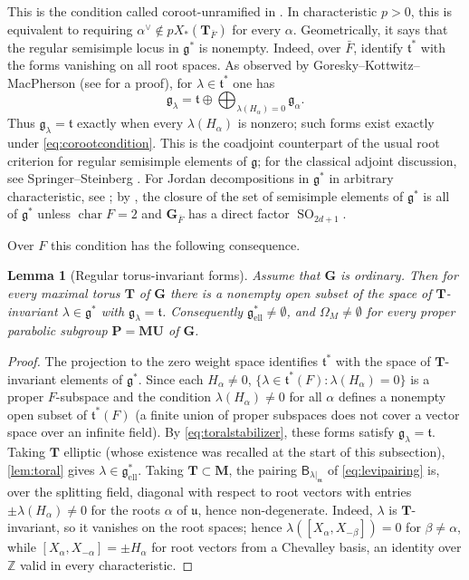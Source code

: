 \documentclass[11pt,reqno]{amsart}
\numberwithin{equation}{section}
\theoremstyle{plain}
\newtheorem{lemma}[theorem]{Lemma}
\theoremstyle{definition}
\theoremstyle{remark}
\theoremstyle{plain}
\newcommand{\Z}{\mathbb{Z}}      %
\newcommand{\bG}{\mathbf{G}}     %
\newcommand{\bP}{\mathbf{P}}     %
\newcommand{\bM}{\mathbf{M}}     %
\newcommand{\bU}{\mathbf{U}}     %
\newcommand{\bT}{\mathbf{T}}     %
\newcommand{\g}{\mathfrak{g}}    %
\newcommand{\gd}{\mathfrak{g}^*} %
\newcommand{\uu}{\mathfrak{u}}   %
\newcommand{\m}{\mathfrak{m}}    %
\newcommand{\liet}{\mathfrak{t}}  %
\newcommand{\Ell}[2][]{#2_{#1\mathrm{ell}}}   %
\DeclareMathOperator{\SO}{SO}
\DeclareMathOperator{\chr}{char}   %
\newcommand{\ordinary}{ordinary}
\newcommand{\lf}{\lambda}
\newcommand{\Bf}{\mathsf{B}}
\begin{document}
This is the condition called coroot-unramified in \cite[Definition~2.4]{Chi26}.
In characteristic $p>0$, this is equivalent to requiring
$\alpha^\vee\notin pX_*(\bT_{\bar F})$ for every $\alpha$.
Geometrically, it says that the regular semisimple locus in $\gd$ is
nonempty. Indeed, over $\bar F$, identify $\liet^*$ with the forms
vanishing on all root spaces. As observed by Goresky--Kottwitz--MacPherson
\cite[\S6.4]{MR2209851} (see \cite[Lemma~2.2(1) and Corollary~2.3]{Chi26}
for a proof), for $\lf\in\liet^*$ one has
\begin{equation}\label{eq:toralstabilizer}
\g_\lf=\liet\oplus
\bigoplus_{\lf(H_\alpha)=0}\g_\alpha.
\end{equation}
Thus $\g_\lf=\liet$ exactly when every $\lf(H_\alpha)$ is nonzero;
such forms exist exactly under \eqref{eq:corootcondition}.
This is the coadjoint counterpart of the usual root criterion for
regular semisimple elements of $\g$; for the classical adjoint
discussion, see Springer--Steinberg \cite[\S II.3.17]{MR0268192}. For Jordan
decompositions in $\gd$ in arbitrary characteristic, see \cite{ST26}; by
\cite[Theorem~1.1(iv)]{ST26}, the closure of the set of semisimple elements of
$\gd$ is all of $\gd$ unless $\chr F=2$ and $\bG_{\bar F}$ has a direct factor
$\SO_{2d+1}$.

Over $F$ this condition has the following consequence.

\begin{lemma}[Regular torus-invariant forms]\label{lem:coroots}
Assume that $\bG$ is \ordinary{}. Then for every maximal torus $\bT$
of $\bG$ there is a nonempty open subset of the space of $\bT$-invariant
$\lf\in\gd$ with $\g_\lf=\liet$. Consequently
$\Ell{\gd}\ne\emptyset$, and $\Omega_M\ne\emptyset$ for every proper
parabolic subgroup $\bP=\bM\bU$ of $\bG$.
\end{lemma}

\begin{proof}
The projection to the zero weight space identifies $\liet^*$ with the
space of $\bT$-invariant elements of $\gd$. Since each $H_\alpha\ne0$,
$\{\lf\in\liet^*(F):\lf(H_\alpha)=0\}$ is a proper $F$-subspace
and the condition $\lf(H_\alpha)\ne0$ for all $\alpha$ defines a
nonempty open subset of $\liet^*(F)$ (a finite union of proper subspaces
does not cover a vector space over an infinite field).
By \eqref{eq:toralstabilizer}, these forms satisfy $\g_\lf=\liet$.
Taking $\bT$ elliptic (whose existence was recalled at the start of
this subsection), \cref{lem:toral} gives $\lf\in\Ell{\gd}$. Taking
$\bT\subset\bM$, the pairing $\Bf_{\lf|_\m}$ of
\eqref{eq:levipairing} is, over the splitting field, diagonal with
respect to root vectors with entries $\pm\lf(H_\alpha)\ne0$ for the
roots $\alpha$ of $\uu$, hence non-degenerate. Indeed, $\lf$ is
$\bT$-invariant, so it vanishes on the root spaces; hence
$\lf([X_\alpha,X_{-\beta}])=0$ for $\beta\ne\alpha$, while
$[X_\alpha,X_{-\alpha}]=\pm H_\alpha$ for root vectors from a Chevalley
basis, an identity over $\Z$ valid in every characteristic.
\end{proof}
\end{document}
